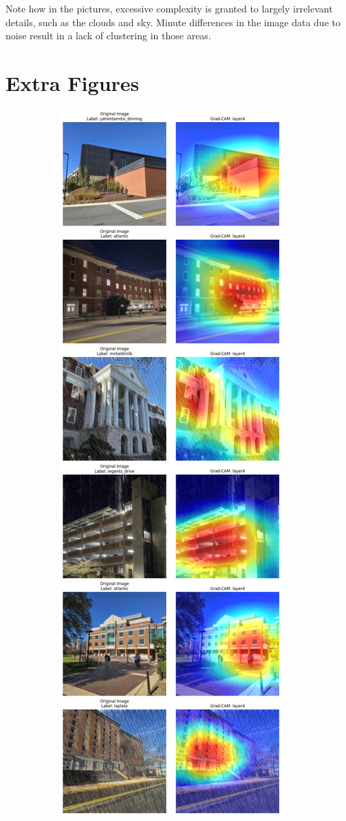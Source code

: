 \documentclass{article}
\begin{document}
Note how in the pictures, excessive complexity is granted to largely irrelevant details, such as the clouds and sky. Minute differences in the image data due to noise result in a lack of clustering in those areas. 

\section{Extra Figures}
\label{extra_figures}

\begin{figure}[H]
    \centering
    \begin{subfigure}[b]{0.45\linewidth}
        \centering
        \includegraphics[width=\linewidth]{new_gradcam_result2.png}

\end{subfigure}
\end{figure}
\end{document}
